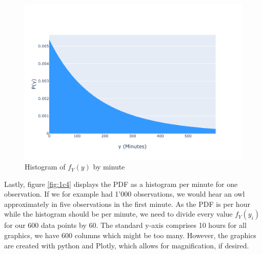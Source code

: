 \begin{figure}[h]
\centering
\includegraphics[width=17cm]{pics/1c4.pdf}
\caption{Histogram of $f_Y(y)$ by minute}
\label{fig:1c4}
\end{figure}
\FloatBarrier

Lastly, figure \eqref{fig:1c4} displays the PDF as a histogram per minute for one observation. If we for example had 1'000 observations, we would hear an owl approximately in five observations in the first minute. As the PDF is per hour while the histogram should be per minute, we need to divide every value $f_Y(y_i)$ for our 600 data points by 60. The standard y-axis comprises 10 hours for all graphics, we have 600 columns which might be too many. However, the graphics are created with python and Plotly, which allows for magnification, if desired. 

